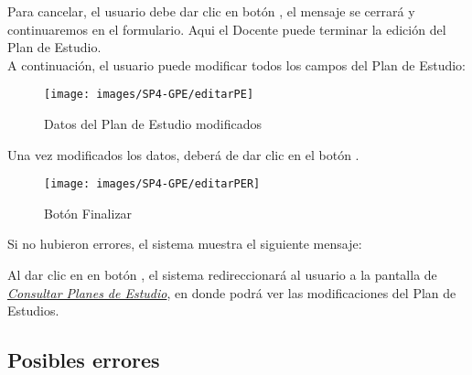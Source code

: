 Para cancelar, el usuario debe dar clic en botón  , el mensaje se cerrará y continuaremos en el formulario. Aqui el Docente puede terminar la edición del Plan de Estudio.\\
A continuación, el usuario puede modificar todos los campos del Plan de Estudio:
\begin{figure}[!hbtp]
	\centering
	\hypertarget{modif}{\texttt{[image: images/SP4-GPE/editarPE]}}
	\caption{Datos del Plan de Estudio modificados}
	\label{modif}
\end{figure}

Una vez modificados los datos, deberá de dar clic en el botón  .
\begin{figure}[!hbtp]
	\centering
	\hypertarget{btnfin}{\texttt{[image: images/SP4-GPE/editarPER]}}
	\caption{Botón Finalizar}
	\label{btnfin}
\end{figure}

Si no hubieron errores, el sistema muestra el siguiente mensaje:

Al dar clic en en botón  , el sistema redireccionará al usuario a la pantalla de \hyperlink{consultarPE}{\textit{Consultar Planes de Estudio}}, en donde podrá ver las modificaciones del Plan de Estudios.\\
\newpage
\subsection{Posibles errores}

